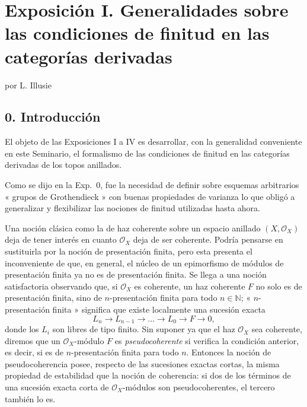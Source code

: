 
\section*{Exposición I. Generalidades sobre las condiciones de finitud en las categorías derivadas}
\begin{center}
por L. Illusie
\end{center}

\subsection*{0. Introducción}
El objeto de las Exposiciones I a IV es desarrollar, con la generalidad conveniente en este Seminario, el formalismo de las condiciones de finitud en las categorías derivadas de los topos anillados.

Como se dijo en la Exp.\ 0, fue la necesidad de definir sobre esquemas arbitrarios « grupos de Grothendieck » con buenas propiedades de varianza lo que obligó a generalizar y flexibilizar las nociones de finitud utilizadas hasta ahora.

Una noción clásica como la de haz coherente sobre un espacio anillado \((X,\mathcal O_X)\) deja de tener interés en cuanto \(\mathcal O_X\) deja de ser coherente. Podría pensarse en sustituirla por la noción de presentación finita, pero esta presenta el inconveniente de que, en general, el núcleo de un epimorfismo de módulos de presentación finita ya no es de presentación finita. Se llega a una noción satisfactoria observando que, si \(\mathcal O_X\) es coherente, un haz coherente \(F\) no solo es de presentación finita, sino de \(n\)-presentación finita para todo \(n\in\mathbb N\); « \(n\)-presentación finita » significa que existe localmente una sucesión exacta
\[
  L_n\longrightarrow L_{n-1}\longrightarrow \ldots \longrightarrow L_0\longrightarrow F\longrightarrow 0,
\]
donde los \(L_i\) son libres de tipo finito. Sin suponer ya que el haz \(\mathcal O_X\) sea coherente, diremos que un \(\mathcal O_X\)-módulo \(F\) es \emph{pseudocoherente} si verifica la condición anterior, es decir, si es de \(n\)-presentación finita para todo \(n\). Entonces la noción de pseudocoherencia posee, respecto de las sucesiones exactas cortas, la misma propiedad de estabilidad que la noción de coherencia: si dos de los términos de una sucesión exacta corta de \(\mathcal O_X\)-módulos son pseudocoherentes, el tercero también lo es.

